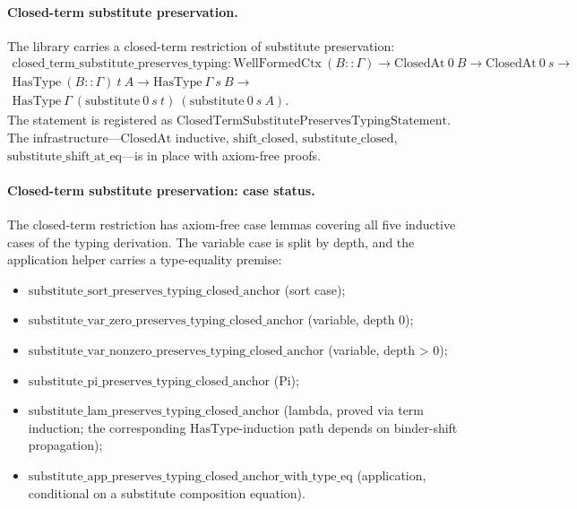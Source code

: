 \paragraph{Closed-term substitute preservation.} The library carries
a closed-term restriction of substitute preservation:
$$
\begin{aligned}
  \mathrm{closed\_term\_substitute\_preserves\_typing} :
  \mathrm{WellFormedCtx}\ (B :: \Gamma) \to
  \mathrm{ClosedAt}\ 0\ B \to
  \mathrm{ClosedAt}\ 0\ s \to \\
  \mathrm{HasType}\ (B :: \Gamma)\ t\ A \to
  \mathrm{HasType}\ \Gamma\ s\ B \to \\
  \mathrm{HasType}\ \Gamma\ (\mathrm{substitute}\ 0\ s\ t)\
    (\mathrm{substitute}\ 0\ s\ A).
\end{aligned}
$$
The statement is registered as
$\mathrm{ClosedTermSubstitutePreservesTypingStatement}$. The
infrastructure---$\mathrm{ClosedAt}$ inductive, $\mathrm{shift\_closed}$,
$\mathrm{substitute\_closed}$, $\mathrm{substitute\_shift\_at\_eq}$---is in
place with axiom-free proofs.

\paragraph{Closed-term substitute preservation: case status.}
The closed-term restriction has axiom-free case lemmas covering all five
inductive cases of the typing derivation. The variable case is split by
depth, and the application helper carries a type-equality premise:

\begin{itemize}
  \item $\mathrm{substitute\_sort\_preserves\_typing\_closed\_anchor}$ (sort case);
  \item $\mathrm{substitute\_var\_zero\_preserves\_typing\_closed\_anchor}$ (variable, depth 0);
  \item $\mathrm{substitute\_var\_nonzero\_preserves\_typing\_closed\_anchor}$ (variable, depth > 0);
  \item $\mathrm{substitute\_pi\_preserves\_typing\_closed\_anchor}$ (Pi);
  \item $\mathrm{substitute\_lam\_preserves\_typing\_closed\_anchor}$ (lambda, proved via term induction; the corresponding $\mathrm{HasType}$-induction path depends on binder-shift propagation);
  \item $\mathrm{substitute\_app\_preserves\_typing\_closed\_anchor\_with\_type\_eq}$ (application, conditional on a substitute composition equation).
\end{itemize}

